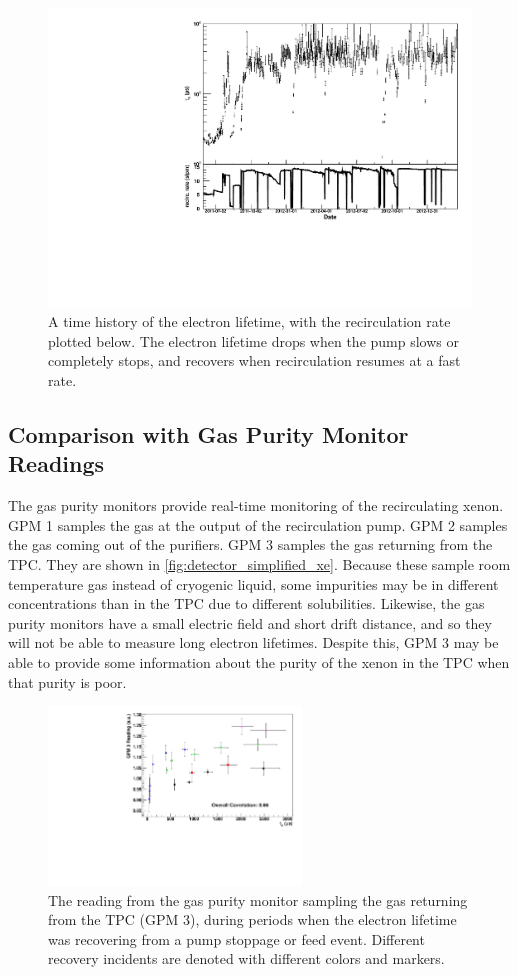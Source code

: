 \documentclass[herrin-thesis.tex]{subfiles}
\begin{document}
\begin{figure}[htbp]
\centering
\includegraphics[width=0.6\columnwidth]{./plots/el_and_recirculation.pdf}
\caption[Time history of electron lifetime and recirculation rate]{A time history of the electron lifetime, with the recirculation rate plotted below. The electron lifetime drops when the pump slows or completely stops, and recovers when recirculation resumes at a fast rate.}
\label{fig:el_and_recirculation}
\end{figure}

\subsection{Comparison with Gas Purity Monitor Readings}
The gas purity monitors \cite{Dobi:2011zr} provide real-time monitoring of the recirculating xenon. GPM 1 samples the gas at the output of the recirculation pump. GPM 2 samples the gas coming out of the purifiers. GPM 3 samples the gas returning from the TPC. They are shown in \cref{fig:detector_simplified_xe}. Because these sample room temperature gas instead of cryogenic liquid, some impurities may be in different concentrations than in the TPC due to different solubilities. Likewise, the gas purity monitors have a small electric field and short drift distance, and so they will not be able to measure long electron lifetimes. Despite this, GPM 3 may be able to provide some information about the purity of the xenon in the TPC when that purity is poor.

\begin{figure}[tbp]
\centering
\includegraphics[width=0.6\textwidth]{./plots/el_gpm_vs_el.pdf}
\caption[GPM 3 reading vs. electron lifetime]{The reading from the gas purity monitor sampling the gas returning from the TPC (GPM 3), during periods when the electron lifetime was recovering from a pump stoppage or feed event. Different recovery incidents are denoted with different colors and markers.}
\label{fig:el_gpm_vs_el}
\end{figure}
\end{document}
